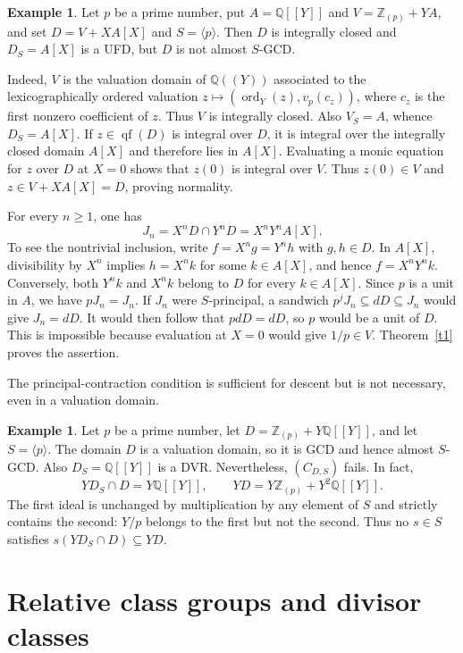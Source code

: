 \documentclass[11pt]{amsart}
\theoremstyle{definition}
\newtheorem{example}[theorem]{Example}
\theoremstyle{remark}
\DeclareMathOperator{\qf}{qf}
\newcommand{\ZZ}{\mathbb Z}
\newcommand{\QQ}{\mathbb Q}
\begin{document}
\begin{example}\label{e2}
Let $p$ be a prime number, put $A=\QQ[[Y]]$ and
$V=\ZZ_{(p)}+YA$, and set
$D=V+XA[X]$ and $S=\langle p\rangle$.
Then $D$ is integrally closed and $D_S=A[X]$ is a UFD, but
$D$ is not almost $S$-GCD.

Indeed, $V$ is the valuation domain of $\QQ((Y))$ associated to
the lexicographically ordered valuation
$z\mapsto(\operatorname{ord}_Y(z),v_p(c_z))$, where $c_z$ is
the first nonzero coefficient of $z$. Thus $V$ is integrally
closed. Also $V_S=A$, whence $D_S=A[X]$.
If $z\in\qf(D)$ is integral over $D$, it is integral over the
integrally closed domain $A[X]$ and therefore lies in $A[X]$.
Evaluating a monic equation for $z$ over $D$ at $X=0$ shows
that $z(0)$ is integral over $V$. Thus $z(0)\in V$ and
$z\in V+XA[X]=D$, proving normality.

For every $n\geq1$, one has
\[
J_n=X^nD\cap Y^nD=X^nY^nA[X].
\]
To see the nontrivial inclusion, write $f=X^ng=Y^nh$ with
$g,h\in D$. In $A[X]$, divisibility by $X^n$ implies
$h=X^nk$ for some $k\in A[X]$, and hence $f=X^nY^nk$.
Conversely, both $Y^nk$ and $X^nk$ belong to $D$ for every
$k\in A[X]$. Since $p$ is a unit in $A$, we have $pJ_n=J_n$.
If $J_n$ were $S$-principal, a sandwich
$p^jJ_n\subseteq dD\subseteq J_n$ would give $J_n=dD$.
It would then follow that $pdD=dD$, so $p$ would be a unit
of $D$. This is impossible because evaluation at $X=0$ would
give $1/p\in V$. Theorem~\ref{t1} proves the assertion.
\end{example}

The principal-contraction condition is sufficient for descent but
is not necessary, even in a valuation domain.

\begin{example}\label{e:C-not-necessary-valuation}
Let $p$ be a prime number, let
$D=\ZZ_{(p)}+Y\QQ[[Y]]$, and let $S=\langle p\rangle$.
The domain $D$ is a valuation domain, so it is GCD and hence
almost $S$-GCD. Also $D_S=\QQ[[Y]]$ is a DVR. Nevertheless,
$(C_{D,S})$ fails. In fact,
\[
YD_S\cap D=Y\QQ[[Y]],\qquad
YD=Y\ZZ_{(p)}+Y^2\QQ[[Y]].
\]
The first ideal is unchanged by multiplication by any element
of $S$ and strictly contains the second: $Y/p$ belongs to the
first but not the second. Thus no $s\in S$ satisfies
$s(YD_S\cap D)\subseteq YD$.
\end{example}


\section{Relative class groups and divisor classes}\label{sec:classes}
\end{document}

